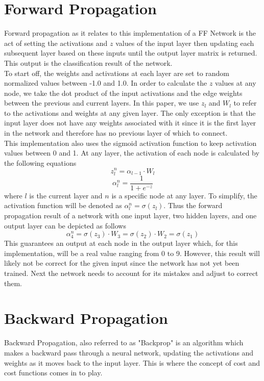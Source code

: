 \documentclass[12pt]{article}
\theoremstyle{definition}
\theoremstyle{plain}
\begin{document}
\section*{Forward Propagation}
Forward propagation as it relates to this implementation of a FF Network is the act of setting the activations and $z$ values of the input layer then updating each subsequent layer based on these inputs until the output layer matrix is returned. This output is the classification result of the network.\\

To start off, the weights and activations at each layer are set to random normalized values between -1.0 and 1.0. In order to calculate the $z$ values at any node, we take the dot product of the input activations and the edge weights between the previous and current layers. In this paper, we use $z_l$ and $W_l$ to refer to the activations and weights at any given layer. The only exception is that the input layer does not have any weights associated with it since it is the first layer in the network and therefore has no previous layer of which to connect.\\

This implementation also uses the sigmoid activation function to keep activation values between 0 and 1. At any layer, the activation of each node is calculated by the following equations
\begin{equation*}
z_l^n = \alpha_{l-1} \cdot W_l
\end{equation*}
\begin{equation*}
\alpha_l^n = \dfrac{1}{1 + e^{-z}}
\end{equation*}
where $l$ is the current layer and $n$ is a specific node at any layer. To simplify, the activation function will be denoted as $\alpha_l^n = \sigma(z_l)$. Thus the forward propagation result of a network with one input layer, two hidden layers, and one output layer can be depicted as follows
\begin{equation*}
\alpha_4^n = \sigma(z_3) \cdot W_3 = \sigma(z_2) \cdot W_2 = \sigma(z_1)
\end{equation*}
This guarantees an output at each node in the output layer which, for this implementation, will be a real value ranging from 0 to 9. However, this result will likely not be correct for the given input since the network has not yet been trained. Next the network needs to account for its mistakes and adjust to correct them.

\section*{Backward Propagation}
Backward Propagation, also referred to as "Backprop" is an algorithm which makes a backward pass through a neural network, updating the activations and weights as it moves back to the input layer. This is where the concept of cost and cost functions comes in to play.\\
\end{document}
